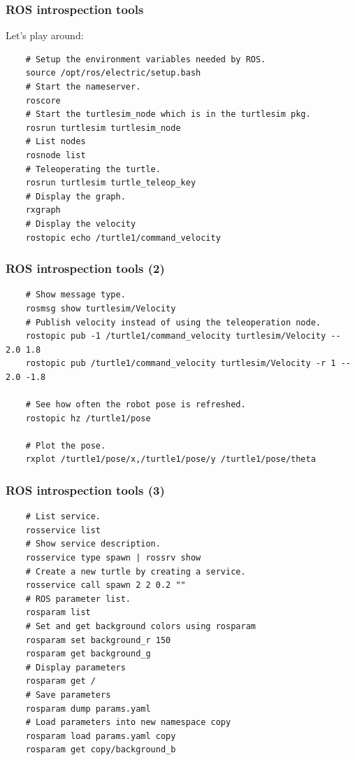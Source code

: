 \documentclass[hyperref={pdfpagelabels=false}]{beamer}
\newenvironment{changemargin}[2]{%
\begin{list}{}{%
\setlength{\topsep}{0pt}%
\setlength{\leftmargin}{#1}%
\setlength{\rightmargin}{#2}%
\setlength{\listparindent}{\parindent}%
\setlength{\itemindent}{\parindent}%
\setlength{\parsep}{\parskip}%
}%
\item[]}{\end{list}}
\begin{document}
\begin{frame}[fragile]
  \frametitle{ROS introspection tools}

  Let's play around:

  \begin{verbatim}
    # Setup the environment variables needed by ROS.
    source /opt/ros/electric/setup.bash
    # Start the nameserver.
    roscore
    # Start the turtlesim_node which is in the turtlesim pkg.
    rosrun turtlesim turtlesim_node
    # List nodes
    rosnode list
    # Teleoperating the turtle.
    rosrun turtlesim turtle_teleop_key
    # Display the graph.
    rxgraph
    # Display the velocity
    rostopic echo /turtle1/command_velocity
  \end{verbatim}

\end{frame}

\begin{frame}[fragile]
  \frametitle{ROS introspection tools (2)}

\begin{changemargin}{-1cm}{-1cm}
  \footnotesize
  \begin{verbatim}
    # Show message type.
    rosmsg show turtlesim/Velocity
    # Publish velocity instead of using the teleoperation node.
    rostopic pub -1 /turtle1/command_velocity turtlesim/Velocity -- 2.0 1.8
    rostopic pub /turtle1/command_velocity turtlesim/Velocity -r 1 -- 2.0 -1.8

    # See how often the robot pose is refreshed.
    rostopic hz /turtle1/pose

    # Plot the pose.
    rxplot /turtle1/pose/x,/turtle1/pose/y /turtle1/pose/theta
  \end{verbatim}
\end{changemargin}

\end{frame}

\begin{frame}[fragile]
  \frametitle{ROS introspection tools (3)}

  \footnotesize
  \begin{verbatim}
    # List service.
    rosservice list
    # Show service description.
    rosservice type spawn | rossrv show
    # Create a new turtle by creating a service.
    rosservice call spawn 2 2 0.2 ""
    # ROS parameter list.
    rosparam list
    # Set and get background colors using rosparam
    rosparam set background_r 150
    rosparam get background_g
    # Display parameters
    rosparam get /
    # Save parameters
    rosparam dump params.yaml
    # Load parameters into new namespace copy
    rosparam load params.yaml copy
    rosparam get copy/background_b
  \end{verbatim}

\end{frame}
\end{document}
